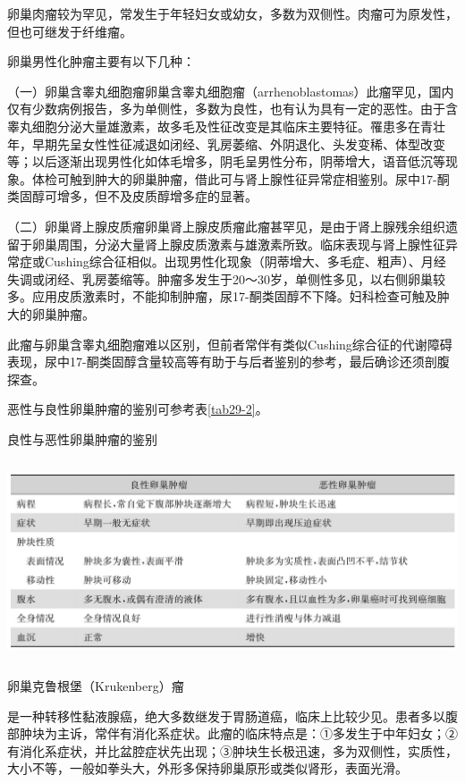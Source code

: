 卵巢肉瘤较为罕见，常发生于年轻妇女或幼女，多数为双侧性。肉瘤可为原发性，但也可继发于纤维瘤。

卵巢男性化肿瘤主要有以下几种：

（一）卵巢含睾丸细胞瘤卵巢含睾丸细胞瘤（arrhenoblastomas）此瘤罕见，国内仅有少数病例报告，多为单侧性，多数为良性，也有认为具有一定的恶性。由于含睾丸细胞分泌大量雄激素，故多毛及性征改变是其临床主要特征。罹患多在青壮年，早期先呈女性性征减退如闭经、乳房萎缩、外阴退化、头发变稀、体型改变等；以后逐渐出现男性化如体毛增多，阴毛呈男性分布，阴蒂增大，语音低沉等现象。体检可触到肿大的卵巢肿瘤，借此可与肾上腺性征异常症相鉴别。尿中17-酮类固醇可增多，但不及皮质醇增多症的显著。

（二）卵巢肾上腺皮质瘤卵巢肾上腺皮质瘤此瘤甚罕见，是由于肾上腺残余组织遗留于卵巢周围，分泌大量肾上腺皮质激素与雄激素所致。临床表现与肾上腺性征异常症或Cushing综合征相似。出现男性化现象（阴蒂增大、多毛症、粗声）、月经失调或闭经、乳房萎缩等。肿瘤多发生于20～30岁，单侧性多见，以右侧卵巢较多。应用皮质激素时，不能抑制肿瘤，尿17-酮类固醇不下降。妇科检查可触及肿大的卵巢肿瘤。

此瘤与卵巢含睾丸细胞瘤难以区别，但前者常伴有类似Cushing综合征的代谢障碍表现，尿中17-酮类固醇含量较高等有助于与后者鉴别的参考，最后确诊还须剖腹探查。

恶性与良性卵巢肿瘤的鉴别可参考表\ref{tab29-2}。

\begin{table}[htbp]
\centering
\caption{良性与恶性卵巢肿瘤的鉴别}
\label{tab29-2}
\includegraphics[width=5.90625in,height=2.33333in]{./images/Image00155.jpg}
\end{table}

卵巢克鲁根堡（Krukenberg）瘤

是一种转移性黏液腺癌，绝大多数继发于胃肠道癌，临床上比较少见。患者多以腹部肿块为主诉，常伴有消化系症状。此瘤的临床特点是：①多发生于中年妇女；②有消化系症状，并比盆腔症状先出现；③肿块生长极迅速，多为双侧性，实质性，大小不等，一般如拳头大，外形多保持卵巢原形或类似肾形，表面光滑。

